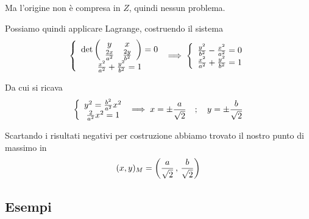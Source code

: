 Ma l'origine non è compresa in $Z$, quindi nessun problema.

Possiamo quindi applicare Lagrange, costruendo il sistema
\begin{align}
	\left\{\begin{array}{cc} \det \left( \begin{array}{ccc} y & x \\ \frac{2x}{a^2} & \frac{2y}{b^2} \end{array} \right)=0 \\ \frac{x^2}{a^2} + \frac{y^2}{b^2}=1 \end{array}\right.\implies
	\left\{\begin{array}{cc} \frac{y^2}{b^2} - \frac{x^2}{a^2}=0 \\ \frac{x^2}{a^2} + \frac{y^2}{b^2}=1 \end{array}\right.
\end{align}

Da cui si ricava
\begin{align}
	\left\{\begin{array}{cc} y^2 = \frac{b^2}{a^2}x^2 \\ \frac{2}{a^2}x^2=1 \end{array}\right. \implies x = \pm \frac{a}{\sqrt{2}} \quad ; \quad y= \pm \frac{b}{\sqrt{2}}
\end{align}

Scartando i risultati negativi per costruzione abbiamo trovato il nostro punto di massimo in
\begin{align}
	(x,y)_M= \left(\frac{a}{\sqrt{2}} \, , \, \frac{b}{\sqrt{2}}\right)
\end{align}

\subsection{Esempi}

